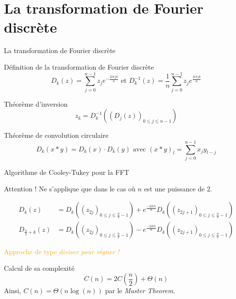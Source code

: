 \documentclass{beamer}
\begin{document}
\section{La transformation de Fourier discrète}
\begin{frame}{La transformation de Fourier discrète}

    \begin{block}{Définition de la transformation de Fourier discrète}
        $$D_k(z) = \sum_{j=0}^{n-1}z_j e^{-\frac{2i \pi j k}{n}} \text{\ \ et\ \ } D_k^{-1}(z) = \frac{1}{n}\sum_{j=0}^{n-1}z_j e^{\frac{2i \pi j k}{n}}$$
    \end{block}
    
    \begin{exampleblock}{Théorème d'inversion}
    $$z_k = D_k^{-1}\left( \left(D_j(z)\right)_{0\le j\le n-1} \right)$$
    \end{exampleblock}
    
    \begin{exampleblock}{Théorème de convolution circulaire}
        $$D_k(x*y) = D_k(x)\cdot D_k(y) \text{\ \ avec\ \ } (x*y)_l = \sum_{j=0}^{n-1}x_j y_{l-j}$$
    \end{exampleblock}
\end{frame}

\begin{frame}{Algorithme de Cooley-Tukey pour la FFT}
\begin{alertblock}{Attention !}
      Ne s'applique que dans le cas où $n$ est une puissance de $2$.
\end{alertblock}
    \begin{align*}
  D_k(z) &= D_k\left((z_{2j})_{0 \le j \le \frac{n}{2}-1}\right)
          +  e^{\frac{-2ik\pi}{n}}D_k\left((z_{2j+1})_{0 \le j \le \frac{n}{2}-1}\right) \\
  D_{\frac{n}{2} + k}(z) &= D_k\left((z_{2j})_{0 \le j \le \frac{n}{2}-1}\right)
          -  e^{\frac{-2ik\pi}{n}}D_k\left((z_{2j+1})_{0 \le j \le \frac{n}{2}-1}\right)
\end{align*}
    \begin{center}
    \textcolor{orange}{Approche de type \emph{diviser pour régner !}}
    \end{center}
    
\begin{exampleblock}{Calcul de sa complexité}
$$  C(n) = 2C\left(\frac{n}{2}\right) + \Theta(n) $$
Ainsi, $C(n) = \Theta(n\log(n))$ par le \emph{Master Theorem}.
\end{exampleblock}
\end{frame}
\end{document}
